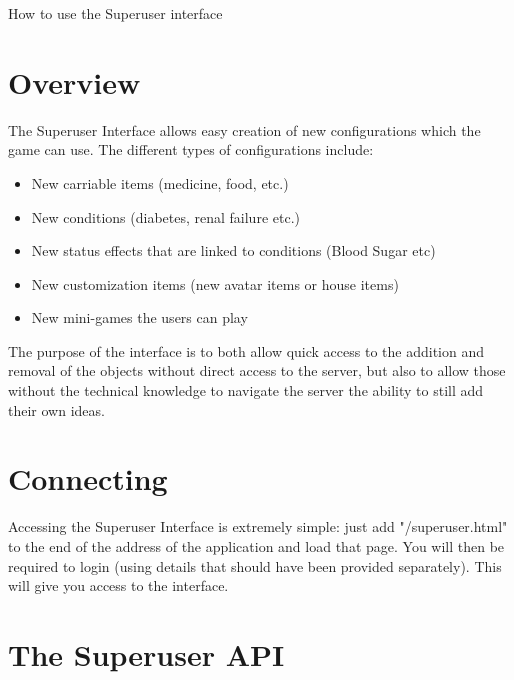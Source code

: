 \documentclass[a4paper,12pt]{article}
\begin{document}
\begin{center}
{\Huge How to use the Superuser interface}
\end{center}


\section{Overview}

The Superuser Interface allows easy creation of new configurations which the game can use.
The different types of configurations include:
\begin{itemize}
	\item New carriable items (medicine, food, etc.)
	\item New conditions (diabetes, renal failure etc.)
	\item New status effects that are linked to conditions (Blood Sugar etc)
	\item New customization items (new avatar items or house items)
	\item New mini-games the users can play
\end{itemize}

The purpose of the interface is to both allow quick access to the addition and removal of the objects without
direct access to the server, but also to allow those without the technical knowledge to navigate the server the
ability to still add their own ideas.


\section{Connecting}

Accessing the Superuser Interface is extremely simple: just add "/superuser.html" to the end of the address of the application and load that page. You will then be required to login (using details that should have been provided separately). This will give you access to the interface.

\section{The Superuser API}
\end{document}
